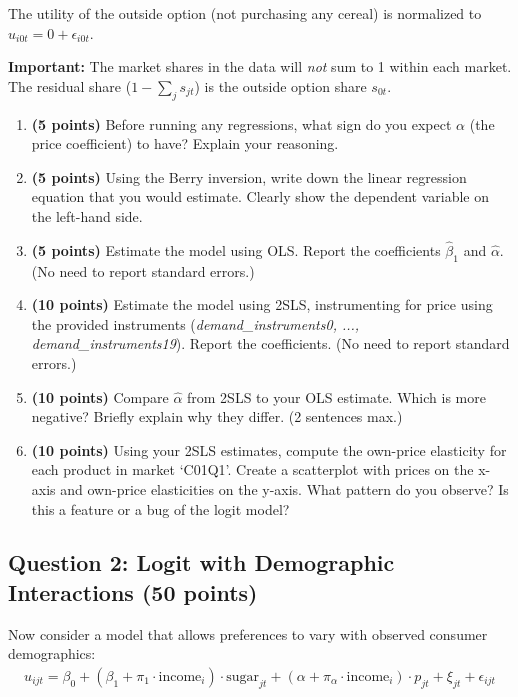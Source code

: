 \documentclass[11pt]{article}
\begin{document}
The utility of the outside option (not purchasing any cereal) is normalized to $u_{i0t} = 0 + \epsilon_{i0t}$.

\textbf{Important:} The market shares in the data will \textit{not} sum to 1 within each market. The residual share ($1 - \sum_j s_{jt}$) is the outside option share $s_{0t}$.

\begin{enumerate}
	\item \textbf{(5 points)} Before running any regressions, what sign do you expect $\alpha$ (the price coefficient) to have? Explain your reasoning.

	\item \textbf{(5 points)} Using the Berry inversion, write down the linear regression equation that you would estimate. Clearly show the dependent variable on the left-hand side.

	\item \textbf{(5 points)} Estimate the model using OLS. Report the coefficients $\hat{\beta}_1$ and $\hat{\alpha}$. (No need to report standard errors.)

	\item \textbf{(10 points)} Estimate the model using 2SLS, instrumenting for price using the provided instruments (\textit{demand\_instruments0, ..., demand\_instruments19}). Report the coefficients. (No need to report standard errors.)

	\item \textbf{(10 points)} Compare $\hat{\alpha}$ from 2SLS to your OLS estimate. Which is more negative? Briefly explain why they differ. (2 sentences max.)

	\item \textbf{(10 points)} Using your 2SLS estimates, compute the own-price elasticity for each product in market `C01Q1'. Create a scatterplot with prices on the x-axis and own-price elasticities on the y-axis. What pattern do you observe? Is this a feature or a bug of the logit model?
\end{enumerate}

\subsection*{Question 2: Logit with Demographic Interactions (50 points)}

Now consider a model that allows preferences to vary with observed consumer demographics:
\begin{align*}
	u_{ijt} = \beta_0 + (\beta_1 + \pi_1 \cdot \text{income}_i) \cdot \text{sugar}_{jt} + (\alpha + \pi_\alpha \cdot \text{income}_i) \cdot p_{jt} + \xi_{jt} + \epsilon_{ijt}
\end{align*}
\end{document}
